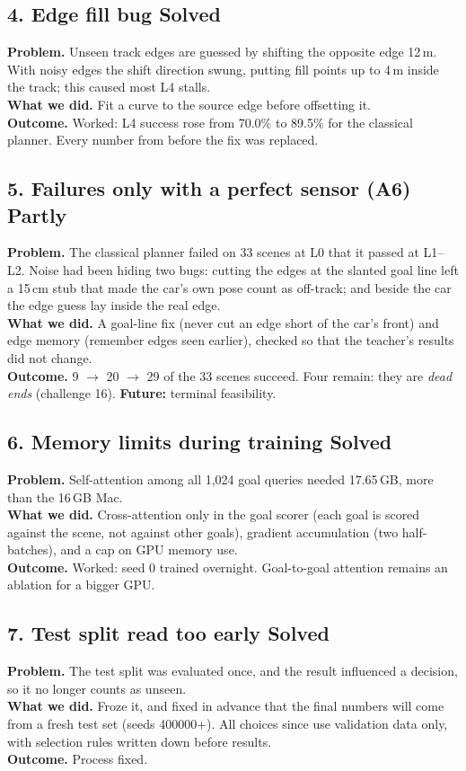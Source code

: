 \documentclass[11pt,a4paper]{article}
\newcommand{\solved}{\textcolor{okc}{\textbf{Solved}}}
\newcommand{\partly}{\textcolor{accent}{\textbf{Partly}}}
\begin{document}
\subsection*{4. Edge fill bug \hfill\solved}
\textbf{Problem.} Unseen track edges are guessed by shifting the opposite edge 12\,m. With noisy edges the
shift direction swung, putting fill points up to 4\,m inside the track; this caused most L4 stalls.\\
\textbf{What we did.} Fit a curve to the source edge before offsetting it.\\
\textbf{Outcome.} Worked: L4 success rose from 70.0\% to 89.5\% for the classical planner. Every number from
before the fix was replaced.

\subsection*{5. Failures only with a perfect sensor (A6) \hfill\partly}
\textbf{Problem.} The classical planner failed on 33 scenes at L0 that it passed at L1--L2. Noise had been
hiding two bugs: cutting the edges at the slanted goal line left a 15\,cm stub that made the car's own pose
count as off-track; and beside the car the edge guess lay inside the real edge.\\
\textbf{What we did.} A goal-line fix (never cut an edge short of the car's front) and edge memory (remember
edges seen earlier), checked so that the teacher's results did not change.\\
\textbf{Outcome.} 9 $\to$ 20 $\to$ 29 of the 33 scenes succeed. Four remain: they are \emph{dead ends}
(challenge 16). \textbf{Future:} terminal feasibility.

\subsection*{6. Memory limits during training \hfill\solved}
\textbf{Problem.} Self-attention among all 1{,}024 goal queries needed 17.65\,GB, more than the 16\,GB Mac.\\
\textbf{What we did.} Cross-attention only in the goal scorer (each goal is scored against the scene, not
against other goals), gradient accumulation (two half-batches), and a cap on GPU memory use.\\
\textbf{Outcome.} Worked: seed 0 trained overnight. Goal-to-goal attention remains an ablation for a bigger GPU.

\subsection*{7. Test split read too early \hfill\solved}
\textbf{Problem.} The test split was evaluated once, and the result influenced a decision, so it no longer
counts as unseen.\\
\textbf{What we did.} Froze it, and fixed in advance that the final numbers will come from a fresh test set
(seeds 400000+). All choices since use validation data only, with selection rules written down before results.\\
\textbf{Outcome.} Process fixed.
\end{document}
